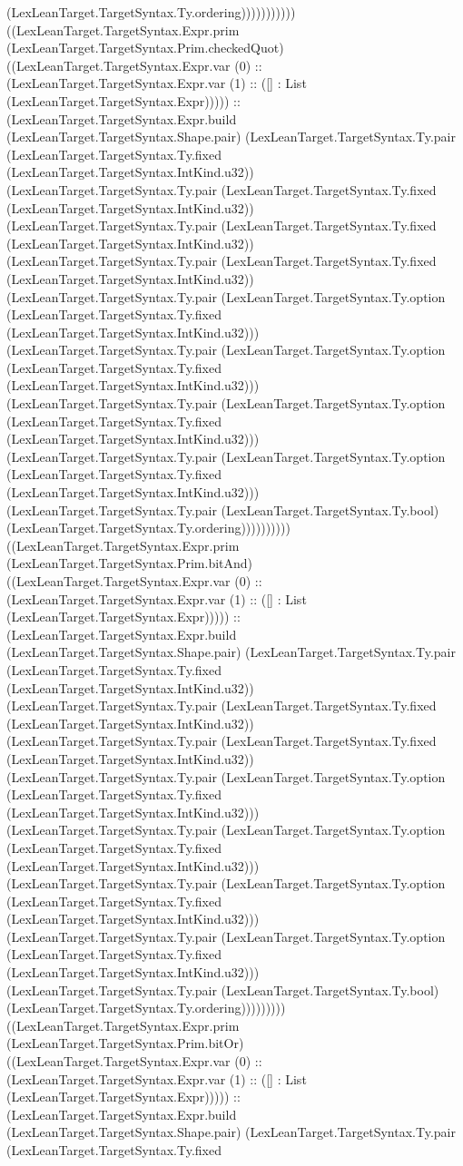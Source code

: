 \documentclass[11pt]{article}
\begin{document}
(LexLeanTarget.TargetSyntax.Ty.ordering))))))))))) ((LexLeanTarget.TargetSyntax.Expr.prim (LexLeanTarget.TargetSyntax.Prim.checkedQuot) ((LexLeanTarget.TargetSyntax.Expr.var (0) :: (LexLeanTarget.TargetSyntax.Expr.var (1) :: ([] : List (LexLeanTarget.TargetSyntax.Expr))))) :: (LexLeanTarget.TargetSyntax.Expr.build (LexLeanTarget.TargetSyntax.Shape.pair) (LexLeanTarget.TargetSyntax.Ty.pair (LexLeanTarget.TargetSyntax.Ty.fixed (LexLeanTarget.TargetSyntax.IntKind.u32)) (LexLeanTarget.TargetSyntax.Ty.pair (LexLeanTarget.TargetSyntax.Ty.fixed (LexLeanTarget.TargetSyntax.IntKind.u32)) (LexLeanTarget.TargetSyntax.Ty.pair (LexLeanTarget.TargetSyntax.Ty.fixed (LexLeanTarget.TargetSyntax.IntKind.u32)) (LexLeanTarget.TargetSyntax.Ty.pair (LexLeanTarget.TargetSyntax.Ty.fixed (LexLeanTarget.TargetSyntax.IntKind.u32)) (LexLeanTarget.TargetSyntax.Ty.pair (LexLeanTarget.TargetSyntax.Ty.option (LexLeanTarget.TargetSyntax.Ty.fixed (LexLeanTarget.TargetSyntax.IntKind.u32))) (LexLeanTarget.TargetSyntax.Ty.pair (LexLeanTarget.TargetSyntax.Ty.option (LexLeanTarget.TargetSyntax.Ty.fixed (LexLeanTarget.TargetSyntax.IntKind.u32))) (LexLeanTarget.TargetSyntax.Ty.pair (LexLeanTarget.TargetSyntax.Ty.option (LexLeanTarget.TargetSyntax.Ty.fixed (LexLeanTarget.TargetSyntax.IntKind.u32))) (LexLeanTarget.TargetSyntax.Ty.pair (LexLeanTarget.TargetSyntax.Ty.option (LexLeanTarget.TargetSyntax.Ty.fixed (LexLeanTarget.TargetSyntax.IntKind.u32))) (LexLeanTarget.TargetSyntax.Ty.pair (LexLeanTarget.TargetSyntax.Ty.bool) (LexLeanTarget.TargetSyntax.Ty.ordering)))))))))) ((LexLeanTarget.TargetSyntax.Expr.prim (LexLeanTarget.TargetSyntax.Prim.bitAnd) ((LexLeanTarget.TargetSyntax.Expr.var (0) :: (LexLeanTarget.TargetSyntax.Expr.var (1) :: ([] : List (LexLeanTarget.TargetSyntax.Expr))))) :: (LexLeanTarget.TargetSyntax.Expr.build (LexLeanTarget.TargetSyntax.Shape.pair) (LexLeanTarget.TargetSyntax.Ty.pair (LexLeanTarget.TargetSyntax.Ty.fixed (LexLeanTarget.TargetSyntax.IntKind.u32)) (LexLeanTarget.TargetSyntax.Ty.pair (LexLeanTarget.TargetSyntax.Ty.fixed (LexLeanTarget.TargetSyntax.IntKind.u32)) (LexLeanTarget.TargetSyntax.Ty.pair (LexLeanTarget.TargetSyntax.Ty.fixed (LexLeanTarget.TargetSyntax.IntKind.u32)) (LexLeanTarget.TargetSyntax.Ty.pair (LexLeanTarget.TargetSyntax.Ty.option (LexLeanTarget.TargetSyntax.Ty.fixed (LexLeanTarget.TargetSyntax.IntKind.u32))) (LexLeanTarget.TargetSyntax.Ty.pair (LexLeanTarget.TargetSyntax.Ty.option (LexLeanTarget.TargetSyntax.Ty.fixed (LexLeanTarget.TargetSyntax.IntKind.u32))) (LexLeanTarget.TargetSyntax.Ty.pair (LexLeanTarget.TargetSyntax.Ty.option (LexLeanTarget.TargetSyntax.Ty.fixed (LexLeanTarget.TargetSyntax.IntKind.u32))) (LexLeanTarget.TargetSyntax.Ty.pair (LexLeanTarget.TargetSyntax.Ty.option (LexLeanTarget.TargetSyntax.Ty.fixed (LexLeanTarget.TargetSyntax.IntKind.u32))) (LexLeanTarget.TargetSyntax.Ty.pair (LexLeanTarget.TargetSyntax.Ty.bool) (LexLeanTarget.TargetSyntax.Ty.ordering))))))))) ((LexLeanTarget.TargetSyntax.Expr.prim (LexLeanTarget.TargetSyntax.Prim.bitOr) ((LexLeanTarget.TargetSyntax.Expr.var (0) :: (LexLeanTarget.TargetSyntax.Expr.var (1) :: ([] : List (LexLeanTarget.TargetSyntax.Expr))))) :: (LexLeanTarget.TargetSyntax.Expr.build (LexLeanTarget.TargetSyntax.Shape.pair) (LexLeanTarget.TargetSyntax.Ty.pair (LexLeanTarget.TargetSyntax.Ty.fixed 
\end{document}
